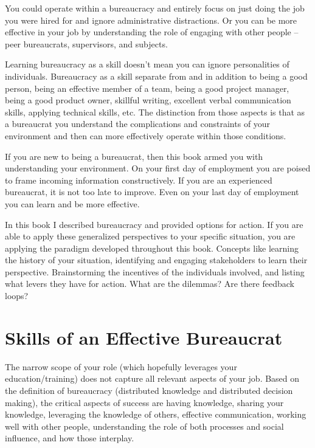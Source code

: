 You could operate within a bureaucracy and entirely focus on just doing the job you were hired for and ignore administrative distractions. Or you can be more effective in your job by understanding the role of engaging with other people -- peer bureaucrats, supervisors, and subjects. 

Learning bureaucracy as a skill doesn't mean you can ignore personalities of individuals. Bureaucracy as a skill separate from and in addition to being a good person, being an effective member of a team, being a good project manager, being a good product owner, skillful writing, excellent verbal communication skills, applying technical skills, etc. The distinction from those aspects is that as a bureaucrat you understand the complications and constraints of your environment and then can more effectively operate within those conditions.

If you are new to being a bureaucrat, then this book armed you with understanding your environment. On your first day of employment you are poised to frame incoming information constructively.
If you are an experienced bureaucrat, it is not too late to improve. Even on your last day of employment you can learn and be more effective.

In this book I described bureaucracy and provided options for action. If you are able to apply these generalized perspectives to your specific situation, you are applying the paradigm developed throughout this book. Concepts like learning the history of your situation, identifying and engaging stakeholders to learn their perspective. Brainstorming the incentives of the individuals involved, and listing what levers they have for action. What are the dilemmas? Are there feedback loops?


\section{Skills of an Effective Bureaucrat}

The narrow scope of your role (which hopefully leverages your education/training) does not capture all relevant aspects of your job. 
Based on the definition of bureaucracy (distributed knowledge and distributed decision making), the critical aspects of success are having knowledge, sharing your knowledge, leveraging the knowledge of others, effective communication, working well with other people, understanding the role of both processes and social influence, and how those interplay. 

